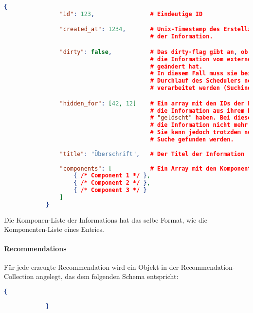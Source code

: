 		\begin{lstlisting}[language=JSON]
			{
				"id": 123,                # Eindeutige ID

				"created_at": 1234,       # Unix-Timestamp des Erstellzeitpunktes
				                          # der Information.

				"dirty": false,           # Das dirty-flag gibt an, ob sich
				                          # die Information vom externen Service
				                          # geändert hat.
				                          # In diesem Fall muss sie beim nächsten
				                          # Durchlauf des Schedulers neu
				                          # verarbeitet werden (Suchindex!).

				"hidden_for": [42, 12]    # Ein array mit den IDs der Benutzer, die
				                          # die Information aus ihrem Newsfeed
				                          # "gelöscht" haben. Bei diesen wird 
				                          # die Information nicht mehr angezeigt.
				                          # Sie kann jedoch trotzdem noch über die
				                          # Suche gefunden werden.
				
				"title": "Überschrift",   # Der Titel der Information
				
				"components": [           # Ein Array mit den Komponenten der Information
					{ /* Component 1 */ },
					{ /* Component 2 */ },
					{ /* Component 3 */ }
				]
			}
		\end{lstlisting}

		Die Komponen-Liste der Informations hat das selbe Format, wie die Komponenten-Liste eines Entries.

	\paragraph{Recommendations} %
	\label{par:reccomendations}
		
		Für jede erzeugte Recommendation wird ein Objekt in der Recommendation-Collection angelegt, das dem folgenden Schema entspricht:

		\begin{lstlisting}[language=JSON]
			{
				
			}
		\end{lstlisting}

